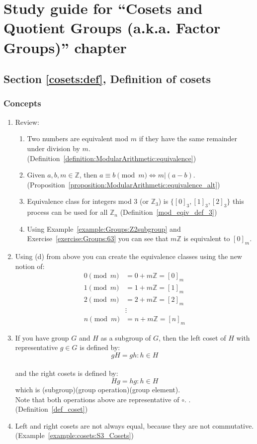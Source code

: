 \section{Study guide  for ``Cosets and Quotient Groups (a.k.a. Factor Groups)''  chapter}
\label{sec:cosets:study} 


\subsection*{Section \ref{cosets:def}, Definition of cosets}
\subsubsection*{Concepts}
\begin{enumerate}
\item 
Review:
	\begin{enumerate}
	\item
	Two numbers are equivalent mod $m$ if they have the same remainder under division by $m$. (Definition~\ref{definition:ModularArithmetic:equivalence})
	\item
	Given $a, b, m \in {\mathbb Z}$, then $a \equiv b \pmod{m} \iff m | (a - b)$. (Proposition~\ref{proposition:ModularArithmetic:equivalence_alt})
	\item
	Equivalence class for integers mod 3 (or ${\mathbb Z}_3$) is $\{ [0]_3, [1]_3, [2]_3 \}$ this process can be used for all ${\mathbb Z}_n$ (Definition~\ref{mod_eqiv_def_3})
	\item
	Using Example~\ref{example:Groups:Z2subgroup} and Exercise~\ref{exercise:Groups:63} you can see that $m{\mathbb Z}$ is equivalent to  $[0]_m$.
	\end{enumerate}
	
\item
Using (d) from above you can create the equivalence classes using the new notion of:
	\begin{align*}
	0 \pmod{m} &= 0 + m{\mathbb Z} = [0]_m
	\\
	1 \pmod{m} &= 1 + m{\mathbb Z} = [1]_m
	\\
	2 \pmod{m} &= 2 + m{\mathbb Z} =  [2]_m
	\\
	&\vdots
	\\
	n \pmod{m} &= n + m{\mathbb Z} =  [n]_m
	\end{align*}

\item
If you have group $G$ and $H$ as a subgroup of $G$, then the left coset of $H$ with representative $g \in G$ is defined by:
\\
$$gH = {gh:h \in H}$$
\\
and the right cosets is defined by:
\\
$$Hg = {hg:h \in H}$$
which is (subgroup)(group operation)(group element).
\\
Note that both operations above are representative of $\circ$. . (Definition~\ref{def_coset})

\item
Left and right cosets are not always equal, because they are not commutative. (Example~\ref{example:cosets:S3_Cosets})
\end{enumerate}

